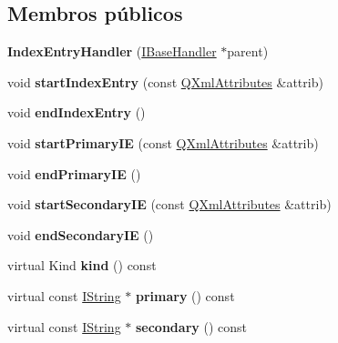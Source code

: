 \subsection*{Membros públicos}
\begin{DoxyCompactItemize}
\item 
\hypertarget{class_index_entry_handler_a660b2f52004eb49480c0dfa379f0da71}{{\bfseries Index\-Entry\-Handler} (\hyperlink{class_i_base_handler}{I\-Base\-Handler} $\ast$parent)}\label{class_index_entry_handler_a660b2f52004eb49480c0dfa379f0da71}

\item 
\hypertarget{class_index_entry_handler_aaac87623a02b661089a61bc607a4fae7}{void {\bfseries start\-Index\-Entry} (const \hyperlink{class_q_xml_attributes}{Q\-Xml\-Attributes} \&attrib)}\label{class_index_entry_handler_aaac87623a02b661089a61bc607a4fae7}

\item 
\hypertarget{class_index_entry_handler_aad07d55e7fc43ed87880ee36a1d7412e}{void {\bfseries end\-Index\-Entry} ()}\label{class_index_entry_handler_aad07d55e7fc43ed87880ee36a1d7412e}

\item 
\hypertarget{class_index_entry_handler_aab91966e5584c9b89daf08426a084f3b}{void {\bfseries start\-Primary\-I\-E} (const \hyperlink{class_q_xml_attributes}{Q\-Xml\-Attributes} \&attrib)}\label{class_index_entry_handler_aab91966e5584c9b89daf08426a084f3b}

\item 
\hypertarget{class_index_entry_handler_a6a5a0a63d5d440a333019fe3083fbcfc}{void {\bfseries end\-Primary\-I\-E} ()}\label{class_index_entry_handler_a6a5a0a63d5d440a333019fe3083fbcfc}

\item 
\hypertarget{class_index_entry_handler_a4f1f2c26d96c5d4bcbd16299f1733921}{void {\bfseries start\-Secondary\-I\-E} (const \hyperlink{class_q_xml_attributes}{Q\-Xml\-Attributes} \&attrib)}\label{class_index_entry_handler_a4f1f2c26d96c5d4bcbd16299f1733921}

\item 
\hypertarget{class_index_entry_handler_a292db547941f43bfd11a97be41ea9252}{void {\bfseries end\-Secondary\-I\-E} ()}\label{class_index_entry_handler_a292db547941f43bfd11a97be41ea9252}

\item 
\hypertarget{class_index_entry_handler_af8e62c8a81ddf2283205cc8955de50eb}{virtual Kind {\bfseries kind} () const }\label{class_index_entry_handler_af8e62c8a81ddf2283205cc8955de50eb}

\item 
\hypertarget{class_index_entry_handler_a0896187e0e755e77099d521d200601b0}{virtual const \hyperlink{class_i_string}{I\-String} $\ast$ {\bfseries primary} () const }\label{class_index_entry_handler_a0896187e0e755e77099d521d200601b0}

\item 
\hypertarget{class_index_entry_handler_a651a85a9d466fe1f882116a55da5cfca}{virtual const \hyperlink{class_i_string}{I\-String} $\ast$ {\bfseries secondary} () const }\label{class_index_entry_handler_a651a85a9d466fe1f882116a55da5cfca}

\end{DoxyCompactItemize}
